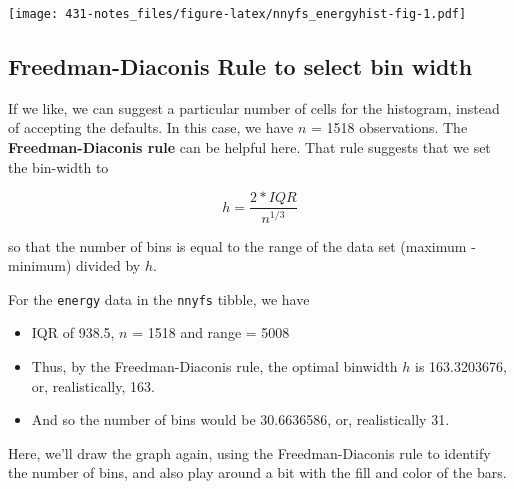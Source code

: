 \documentclass[
]{book}
\newenvironment{Shaded}{\begin{snugshade}}{\end{snugshade}}
\newcommand{\DataTypeTok}[1]{\textcolor[rgb]{0.13,0.29,0.53}{#1}}
\newcommand{\DecValTok}[1]{\textcolor[rgb]{0.00,0.00,0.81}{#1}}
\newcommand{\KeywordTok}[1]{\textcolor[rgb]{0.13,0.29,0.53}{\textbf{#1}}}
\newcommand{\NormalTok}[1]{#1}
\newcommand{\OperatorTok}[1]{\textcolor[rgb]{0.81,0.36,0.00}{\textbf{#1}}}
\newcommand{\StringTok}[1]{\textcolor[rgb]{0.31,0.60,0.02}{#1}}
\providecommand{\tightlist}{%
  \setlength{\itemsep}{0pt}\setlength{\parskip}{0pt}}
\begin{document}
\texttt{[image: 431-notes\_files/figure-latex/nnyfs\_energyhist-fig-1.pdf]}

\hypertarget{freedman-diaconis-rule-to-select-bin-width}{%
\subsection{Freedman-Diaconis Rule to select bin width}\label{freedman-diaconis-rule-to-select-bin-width}}

If we like, we can suggest a particular number of cells for the histogram, instead of accepting the defaults. In this case, we have \(n\) = 1518 observations. The \textbf{Freedman-Diaconis rule} can be helpful here. That rule suggests that we set the bin-width to

\[
h = \frac{2*IQR}{n^{1/3}}
\]

so that the number of bins is equal to the range of the data set (maximum - minimum) divided by \(h\).

For the \texttt{energy} data in the \texttt{nnyfs} tibble, we have

\begin{itemize}
\tightlist
\item
  IQR of 938.5, \(n\) = 1518 and range = 5008
\item
  Thus, by the Freedman-Diaconis rule, the optimal binwidth \(h\) is 163.3203676, or, realistically, 163.
\item
  And so the number of bins would be 30.6636586, or, realistically 31.
\end{itemize}

Here, we'll draw the graph again, using the Freedman-Diaconis rule to identify the number of bins, and also play around a bit with the fill and color of the bars.

\begin{Shaded}
\end{Shaded}
\end{document}
